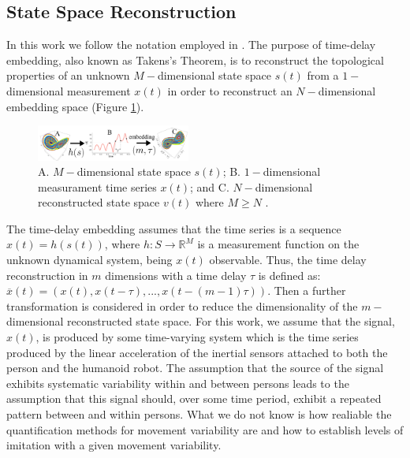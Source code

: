 \documentclass{sigchi}
\begin{document}
\subsection{State Space Reconstruction}
In this work we follow the notation employed in \cite{Uzal2011}.
The purpose of time-delay embedding, also known as Takens's Theorem,
is to reconstruct the topological properties of an unknown $M-$dimensional
state space $s(t)$ from a $1-$dimensional measurement $x(t)$ in order to
reconstruct an $N-$dimensional embedding space (Figure \ref{fig:takens_theorem}).
\begin{figure}[!htb]
\centering
\includegraphics[width=0.45\textwidth]{figures/reconstructed_state_space/fig}
\caption[PA]{A. $M-$dimensional state space $s(t)$; B. $1-$dimensional measurament
time series $x(t)$; and  C. $N-$dimensional reconstructed state space $v(t)$ where $M \geq N$
\cite{QuintanaDuque2012}.}
\label{fig:takens_theorem}
\end{figure}
The time-delay embedding assumes that the time series is a sequence $x(t)=h(s(t))$,
where $h: S \rightarrow \mathbb{R}^M$ is a measurement function on the unknown
dynamical system, being $x(t)$ observable.
Thus, the time delay reconstruction in $m$ dimensions with a time delay
$\tau$ is defined as: $\overline{x}(t) = (x(t), x(t-\tau),...,x(t-(m-1)\tau))$.
Then a further transformation is considered in order to reduce
the dimensionality of the $m-$dimensional reconstructed state space.
For this work, we assume that the signal, $x(t)$, is produced by some time-varying
system which is the time series produced by the linear acceleration of the
inertial sensors attached to both the person and the humanoid robot.
The assumption that the source of the signal exhibits systematic variability
within and between persons leads to the assumption that this signal should,
over some time period, exhibit a repeated pattern between and within persons.
What we do not know is how realiable the quantification methods for movement
variability are and how to establish levels of imitation with a given
movement variability.
\end{document}
